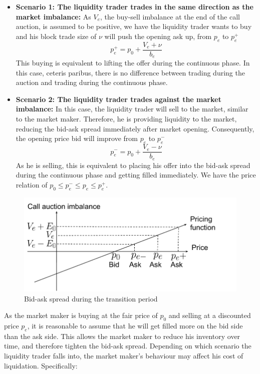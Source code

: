 \begin{itemize}
  \item {\textbf{Scenario 1: The liquidity trader trades in the same direction as the market imbalance:}
        As $V_e$, the buy-sell imbalance at the end of the call auction, is assumed to be positive, we have the liquidity trader wants to buy and his block trade size of $\nu$ will push the opening ask up, from $p_e$ to $p_e^+$
        \[
          p_e^+ =  p_0 + \frac{V_e + \nu}{b_e}
        \]
        This buying is equivalent to lifting the offer during the continuous phase. In this case, ceteris paribus, there is no difference between trading during the auction and trading during the continuous phase.
        }
  \item {
        \textbf{Scenario 2: The liquidity trader trades against the market imbalance:}
        In this case, the liquidity trader will sell to the market, similar to the market maker. Therefore, he is providing liquidity to the market, reducing the bid-ask spread immediately after market opening. Consequently, the opening price bid will improve from $p_e$ to $p_e^-$
        \[
          p_e^- = p_0 + \frac{V_e - \nu}{b_e}
        \]
        As he is selling, this is equivalent to placing his offer into the bid-ask spread during the continuous phase and getting filled immediately. We have the price relation of $p_0 \leq p_e^- \leq p_e \leq p_e^+$.
        }
\end{itemize}

\begin{figure}[h]
  \includegraphics[width=\textwidth]{images/MMPricingTransitionPeriod}
  \caption{Bid-ask spread during the transition period}
  \label{fig:mm_pricing_transition_period}
\end{figure}

As the market maker is buying at the fair price of $p_0$ and selling at a discounted price $p_e$, it is reasonable to assume that he will get filled more on the bid side than the ask side. This allows the market maker to reduce his inventory over time, and therefore tighten the bid-ask spread. Depending on which scenario the liquidity trader falls into, the market maker's behaviour may affect his cost of liquidation. Specifically:

